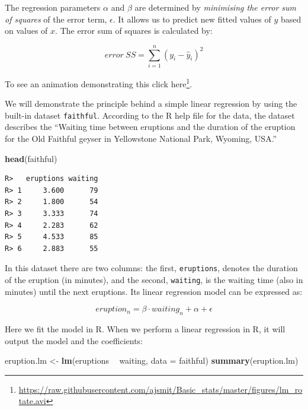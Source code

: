 \documentclass[english,10pt,a4paper,oneside]{book}
\renewcommand{\href}[2]{#2\footnote{\url{#1}}}
\let\rmarkdownfootnote\footnote%
\def\footnote{\protect\rmarkdownfootnote}
\newenvironment{Shaded}{\begin{snugshade}}{\end{snugshade}}
\newcommand{\KeywordTok}[1]{\textcolor[rgb]{0.13,0.29,0.53}{\textbf{#1}}}
\newcommand{\DataTypeTok}[1]{\textcolor[rgb]{0.13,0.29,0.53}{#1}}
\newcommand{\StringTok}[1]{\textcolor[rgb]{0.31,0.60,0.02}{#1}}
\newcommand{\OperatorTok}[1]{\textcolor[rgb]{0.81,0.36,0.00}{\textbf{#1}}}
\newcommand{\NormalTok}[1]{#1}
\theoremstyle{definition}
\theoremstyle{definition}
\theoremstyle{definition}
\theoremstyle{remark}
\begin{document}
The regression parameters \(\alpha\) and \(\beta\) are determined by
\emph{minimising the error sum of squares} of the error term,
\(\epsilon\). It allows us to predict new fitted values of \(y\) based
on values of \(x\). The error sum of squares is calculated by:

\[error~SS=\sum_{i=1}^{n}(y_{i}-\hat{y}_{i})^{2}\]

To see an animation demonstrating this click
\href{https://raw.githubusercontent.com/ajsmit/Basic_stats/master/figures/lm_rotate.avi}{here}.

We will demonstrate the principle behind a simple linear regression by
using the built-in dataset \texttt{faithful}. According to the R help
file for the data, the dataset describes the \enquote{Waiting time
between eruptions and the duration of the eruption for the Old Faithful
geyser in Yellowstone National Park, Wyoming, USA.}

\begin{Shaded}
\begin{Highlighting}[]
\KeywordTok{head}\NormalTok{(faithful)}
\end{Highlighting}
\end{Shaded}

\begin{verbatim}
R>   eruptions waiting
R> 1     3.600      79
R> 2     1.800      54
R> 3     3.333      74
R> 4     2.283      62
R> 5     4.533      85
R> 6     2.883      55
\end{verbatim}

In this dataset there are two columns: the first, \texttt{eruptions},
denotes the duration of the eruption (in minutes), and the second,
\texttt{waiting}, is the waiting time (also in minutes) until the next
eruptions. Its linear regression model can be expressed as:

\[eruption_{n}=\beta \cdot waiting_{n}+\alpha+\epsilon\]

Here we fit the model in R. When we perform a linear regression in R, it
will output the model and the coefficients:

\begin{Shaded}
\begin{Highlighting}[]
\NormalTok{eruption.lm <-}\StringTok{ }\KeywordTok{lm}\NormalTok{(eruptions }\OperatorTok{~}\StringTok{ }\NormalTok{waiting, }\DataTypeTok{data =}\NormalTok{ faithful)}
\KeywordTok{summary}\NormalTok{(eruption.lm)}
\end{Highlighting}
\end{Shaded}
\end{document}
